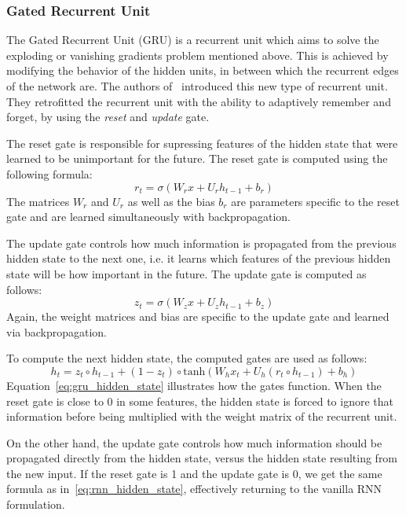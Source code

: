 \subsubsection{Gated Recurrent Unit}\label{sec:gru}
The Gated Recurrent Unit (GRU) is a recurrent unit which aims to solve the exploding or vanishing gradients problem mentioned above.
This is achieved by modifying the behavior of the hidden units, in between which the recurrent edges of the network are.
The authors of~\cite{gru} introduced this new type of recurrent unit.
They retrofitted the recurrent unit with the ability to adaptively remember and forget, by using the \emph{reset} and \emph{update} gate.
\par
The reset gate is responsible for supressing features of the hidden state that were learned to be unimportant for the future.
The reset gate is computed using the following formula:
\begin{equation}\label{eq:gru_reset_gate}
    r_t = \sigma( W_rx + U_rh_{t-1} + b_r)
\end{equation}
The matrices $W_r$ and $U_r$ as well as the bias $b_r$ are parameters specific to the reset gate and are learned simultaneously with backpropagation.
\par
The update gate controls how much information is propagated from the previous hidden state to the next one, i.e. it learns which features of the previous hidden state will be how important in the future.
The update gate is computed as follows:
\begin{equation}\label{eq:gru_update_gate}
    z_t = \sigma( W_zx + U_zh_{t-1} + b_z)
\end{equation}
Again, the weight matrices and bias are specific to the update gate and learned via backpropagation.
\par
To compute the next hidden state, the computed gates are used as follows:
\begin{equation}\label{eq:gru_hidden_state}
    h_t = z_t \circ h_{t-1} + (1 - z_t) \circ \text{tanh}(W_hx_t + U_h(r_t \circ h_{t-1}) + b_h)
\end{equation}
Equation~\ref{eq:gru_hidden_state} illustrates how the gates function.
When the reset gate is close to 0 in some features, the hidden state is forced to ignore that information before being multiplied with the weight matrix of the recurrent unit.
\par
On the other hand, the update gate controls how much information should be propagated directly from the hidden state, versus the hidden state resulting from the new input.
If the reset gate is 1 and the update gate is 0, we get the same formula as in~\ref{eq:rnn_hidden_state}, effectively returning to the vanilla RNN formulation.
